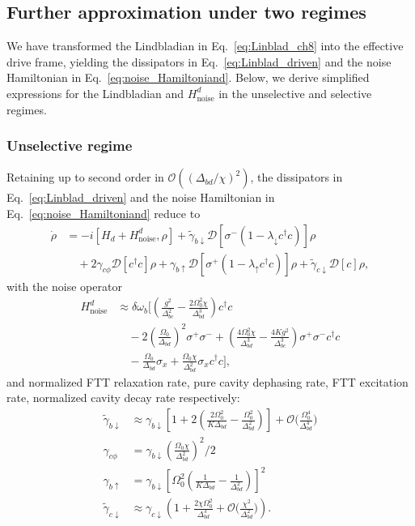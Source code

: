 \subsection{Further approximation under two regimes}
\label{subsec:Lindbladian_regime}
We have transformed the Lindbladian in Eq.~\eqref{eq:Linblad_ch8} into the effective drive frame, yielding the dissipators in Eq.~\eqref{eq:Linblad_driven} and the noise Hamiltonian in Eq.~\eqref{eq:noise_Hamiltoniand}. Below, we derive simplified expressions for the Lindbladian and $H_{\mathrm{noise}}^{d}$ in the unselective and selective regimes.

\subsubsection{Unselective regime}
Retaining up to second order in $\mathcal{O}((\Delta_{bd}/\chi)^2)$, the dissipators in Eq.~\eqref{eq:Linblad_driven} and the noise Hamiltonian in Eq.~\eqref{eq:noise_Hamiltoniand} reduce to 
\begin{align}
\dot{\rho} &= -i [H_d + H_{\text{noise}}^d, \rho]  + \widetilde{\gamma}_{b\downarrow} \mathcal{D}\left[ \sigma^- (1 - \lambda_\downarrow c^\dagger c) \right] \rho \nonumber \\
&\quad + 2\gamma_{c\phi} \mathcal{D}\left[ c^\dagger c \right] \rho + \gamma_{b\uparrow} \mathcal{D}\left[ \sigma^+ (1 - \lambda_\uparrow c^\dagger c) \right] \rho + \widetilde{\gamma}_{c\downarrow} \mathcal{D}[c] \rho,
\end{align}
with the noise operator 
\begin{align}
H_{\text{noise}}^d &\approx \delta \omega_b \Bigg[ \left( \frac{g^2}{\Delta_{bc}^2} - \frac{2 \Omega_0^2 \chi}{\Delta_{bd}^3} \right) c^\dagger c \nonumber \\
&\quad - 2 \left( \frac{\Omega_0}{\Delta_{bd}} \right)^2 \sigma^+ \sigma^- + \left( \frac{4 \Omega_0^2 \chi}{\Delta_{bd}^3} - \frac{4 K g^2}{\Delta_{bc}^3} \right) \sigma^+ \sigma^- c^\dagger c \nonumber \\
&\quad - \frac{\Omega_0}{\Delta_{bd}} \sigma_x + \frac{\Omega_0 \chi}{\Delta_{bd}^2} \sigma_x c^\dagger c \Bigg],
\end{align}
and normalized FTT relaxation rate, pure cavity dephasing rate, FTT excitation rate, normalized cavity decay rate respectively:
\begin{align}
\widetilde{\gamma}_{b\downarrow} &\approx \gamma_{b\downarrow} \left[ 1 + 2\left( \frac{2\Omega_0^2}{K\Delta_{bd}} - \frac{\Omega_0^2}{\Delta_{bd}^2} \right) \right] +\mathcal{O}\bigg(\frac{\Omega^4_0}{\Delta^4_{bd}}\bigg) \\
\gamma_{c\phi} &= \gamma_{b\downarrow} \left( \frac{\Omega_0 \chi}{\Delta_{bd}^2} \right)^2/2 \\
\gamma_{b\uparrow} &= \gamma_{b\downarrow} \left[ \Omega_0^2 \left( \frac{1}{K\Delta_{bd}} - \frac{1}{\Delta_{bd}^2} \right) \right]^2  \\
\widetilde{\gamma}_{c\downarrow} &\approx \gamma_{c\downarrow} \left( 1 + \frac{2\chi \Omega_0^2}{\Delta_{bd}^3} +\mathcal{O}\bigg(\frac{\chi^2 }{\Delta^2_{bd}}\bigg)\right).
\end{align}
